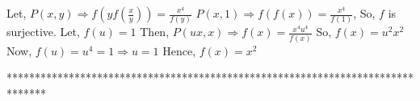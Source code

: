 \begin{solution}
	Let, $P(x,y) \Longrightarrow  f(yf(\frac{x}{y}))=\frac{x^{4}}{f(y)} $
$P(x,1) \Longrightarrow f(f(x))=\frac{x^{4}}{f(1)} $, So, $f$ is surjective.
Let, $f(u)=1$
Then, $P(u x,x) \Longrightarrow f(x)=\frac{x^4 u^4}{f(x)}$
So, $f(x)=u^2 x^2$
Now, $f(u)=u^4=1 \Longrightarrow u=1$
Hence, $f(x)=x^2$
\end{solution}
*******************************************************************************
